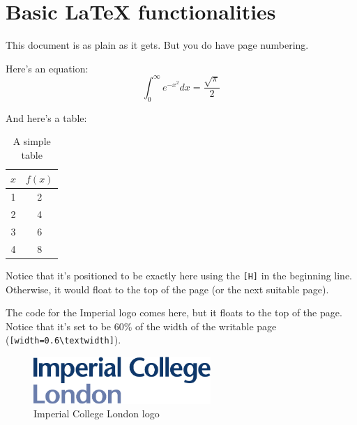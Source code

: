 \documentclass[12pt,twoside]{article}
\begin{document}




\section*{Basic LaTeX functionalities}

This document is as plain as it gets. But you do have page numbering.

Here's an equation:
\begin{equation}
    \int_{0}^{\infty} e^{-x^2} dx = \frac{\sqrt{\pi}}{2}
    \label{eq:gaussian_integral}
\end{equation}

And here's a table:
\begin{table}[H]
    \centering
    \begin{tabular}{c|c}
        $x$ & $f(x)$ \\
        \hline
        1 & 2 \\
        2 & 4 \\
        3 & 6 \\
        4 & 8 \\
    \end{tabular}
    \caption{A simple table}
    \label{tab:simple_table}
\end{table}
Notice that it's positioned to be exactly here using the \texttt{[H]} in the
beginning line. Otherwise, it would float to the top of the page (or the next
suitable page).

The code for the Imperial logo comes here, but it floats to the top of the page.
Notice that it's set to be 60\% of the width of the writable page 
(\texttt{[width=0.6\textbackslash textwidth]}).
\begin{figure}
    \centering
    \includegraphics[width=0.6\textwidth]{./figures/imperial.pdf}
    \caption{Imperial College London logo}
    \label{fig:imperial_logo}
\end{figure}
\end{document}
